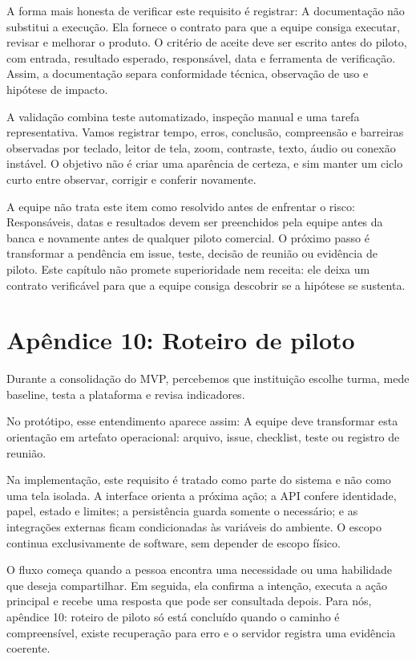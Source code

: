\documentclass[12pt,oneside,a4paper,article]{abntex2}
\begin{document}
A forma mais honesta de verificar este requisito é registrar: A documentação não substitui a execução. Ela fornece o contrato para que a equipe consiga executar, revisar e melhorar o produto. O critério de aceite deve ser escrito antes do piloto, com entrada, resultado esperado, responsável, data e ferramenta de verificação. Assim, a documentação separa conformidade técnica, observação de uso e hipótese de impacto.

A validação combina teste automatizado, inspeção manual e uma tarefa representativa. Vamos registrar tempo, erros, conclusão, compreensão e barreiras observadas por teclado, leitor de tela, zoom, contraste, texto, áudio ou conexão instável. O objetivo não é criar uma aparência de certeza, e sim manter um ciclo curto entre observar, corrigir e conferir novamente.

A equipe não trata este item como resolvido antes de enfrentar o risco: Responsáveis, datas e resultados devem ser preenchidos pela equipe antes da banca e novamente antes de qualquer piloto comercial. O próximo passo é transformar a pendência em issue, teste, decisão de reunião ou evidência de piloto. Este capítulo não promete superioridade nem receita: ele deixa um contrato verificável para que a equipe consiga descobrir se a hipótese se sustenta.

\section{Apêndice 10: Roteiro de piloto}
Durante a consolidação do MVP, percebemos que instituição escolhe turma, mede baseline, testa a plataforma e revisa indicadores.

No protótipo, esse entendimento aparece assim: A equipe deve transformar esta orientação em artefato operacional: arquivo, issue, checklist, teste ou registro de reunião.

Na implementação, este requisito é tratado como parte do sistema e não como uma tela isolada. A interface orienta a próxima ação; a API confere identidade, papel, estado e limites; a persistência guarda somente o necessário; e as integrações externas ficam condicionadas às variáveis do ambiente. O escopo continua exclusivamente de software, sem depender de escopo físico.

O fluxo começa quando a pessoa encontra uma necessidade ou uma habilidade que deseja compartilhar. Em seguida, ela confirma a intenção, executa a ação principal e recebe uma resposta que pode ser consultada depois. Para nós, apêndice 10: roteiro de piloto só está concluído quando o caminho é compreensível, existe recuperação para erro e o servidor registra uma evidência coerente.
\end{document}
